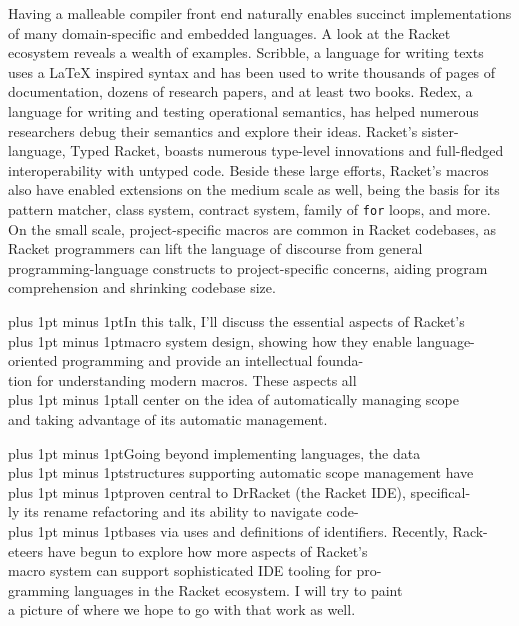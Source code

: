 \documentclass[runningheads]{llncs}
\newcommand{\MoreSpace}{\spaceskip 4pt plus 1pt minus 1pt}
\newcommand{\LittleMoreSpace}{\spaceskip 3pt plus 1pt minus 1pt}
\newcommand{\LittleLessSpace}{\spaceskip 2pt plus 1pt minus 1pt}
\newcommand{\LessSpace}{\spaceskip 1.5pt plus 1pt minus 1pt}
\begin{document}
Having a malleable compiler front end naturally enables succinct
implementations of many domain-specific and embedded languages. A look
at the Racket ecosystem reveals a wealth of examples. Scribble, a
language for writing texts uses a \LaTeX{} inspired syntax and has
been used to write thousands of pages of documentation, dozens of
research papers, and at least two books. Redex, a language for writing
and testing operational semantics, has helped numerous researchers
debug their semantics and explore their ideas. Racket's
sister-language, Typed Racket, boasts numerous type-level innovations
and full-fledged interoperability with untyped code. Beside these
large efforts, Racket's macros also have enabled extensions on the
medium scale as well, being the basis for its pattern matcher, class
system, contract system, family of \texttt{for} loops, and more. On
the small scale, project-specific macros are common in Racket
codebases, as Racket programmers can lift the language of discourse
from general programming-language constructs to project-specific
concerns, aiding program comprehension and shrinking codebase size.

{\MoreSpace{}In this talk, I'll discuss the essential aspects of Racket's}\\
{\MoreSpace{}macro system design, showing how they enable language-}\\
{oriented programming and provide an intellectual founda-}\\
{tion for understanding modern macros. These aspects all}\\
{\LittleMoreSpace{}all center on the idea of automatically managing scope}\\
{and taking advantage of its automatic management.}

{\MoreSpace{}Going beyond implementing languages, the data}\\
{\LessSpace{}structures supporting automatic scope management have}\\
{\LittleLessSpace{}proven central to DrRacket (the Racket IDE), specifical-}\\
{ly its rename refactoring and its ability to navigate code-}\\
{\LessSpace{}bases via uses and definitions of identifiers. Recently, Rack-}\\
{eteers have begun to explore how more aspects of Racket's}\\
{macro system can support sophisticated IDE tooling for pro-}\\
{gramming languages in the Racket ecosystem. I will try to paint}\\
a picture of where we
hope to go with that work as well.
\end{document}
